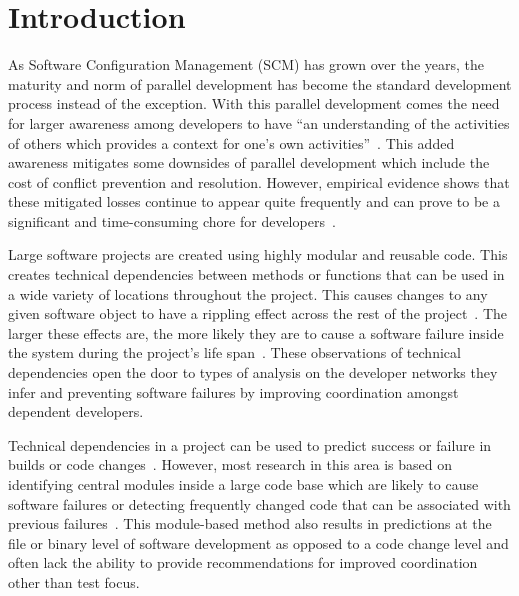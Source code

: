 \label{chapter:introduction}

\section{Introduction}

As Software Configuration Management (SCM) has grown over the years, the maturity and norm of parallel 
development has become the standard development process instead of the exception. With this parallel development
comes the need for larger awareness among developers to have ``an understanding of the activities of others
which provides a context for one's own activities''~\cite{Dourish:1992:ACS}. This added awareness
mitigates some downsides of parallel development which include the cost of conflict prevention and resolution. However,
empirical evidence shows that these mitigated losses continue to appear quite frequently and can prove to be a significant
and time-consuming chore for developers~\cite{Perry:2001:PCL}.

Large software projects are created using highly modular and reusable code. This creates technical dependencies between
methods or functions that can be used in a wide variety of locations throughout the project. This causes changes to any 
given software object to have a rippling effect across the rest of the project~\cite{Acharya:2011:PCI}. The larger these 
effects are, the more likely they are to cause a software failure inside the system during the project's life 
span~\cite{Zimmermann:2008:PDU}. These observations of technical dependencies open the door to types of analysis on the 
developer networks they infer and preventing software failures by improving coordination amongst dependent developers.

Technical dependencies in a project can be used to predict success or failure in builds or code 
changes~\cite{Pinzger:2008:DNP, Zimmermann:2008:PDU}. However, most research in this area is based on identifying central 
modules inside a large code base which are likely to cause software failures or detecting frequently changed code that 
can be associated with previous failures~\cite{Kim:2006:AIB}. This module-based method also results in predictions at 
the file or binary level of software development as opposed to a code change level and often lack the ability to provide 
recommendations for improved coordination other than test focus.

